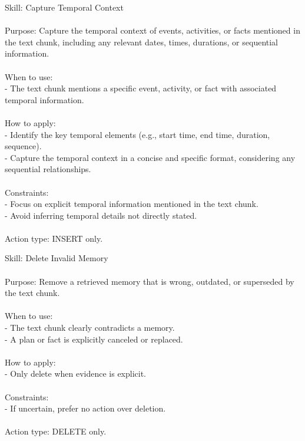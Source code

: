 \begin{center}
\begin{tcolorbox}[
  title={Evolved Skill on LoCoMo - CAPTURE\_TEMPORAL\_CONTEXT},
  colback=blue!2!white,
  colframe=blue!35!black,
  colbacktitle=blue!15!white,
  coltitle=black,
  coltext=black
]
{
Skill: Capture Temporal Context \\\\
Purpose: Capture the temporal context of events, activities, or facts mentioned in the text chunk, including any relevant dates, times, durations, or sequential information. \\\\
When to use: \\
- The text chunk mentions a specific event, activity, or fact with associated temporal information. \\\\
How to apply: \\
- Identify the key temporal elements (e.g., start time, end time, duration, sequence). \\
- Capture the temporal context in a concise and specific format, considering any sequential relationships. \\\\
Constraints: \\
- Focus on explicit temporal information mentioned in the text chunk. \\
- Avoid inferring temporal details not directly stated. \\\\
Action type: INSERT only.
}
\label{appendix:case_capture_temporal_context}
\end{tcolorbox}
\end{center}

\begin{center}
\begin{tcolorbox}[
  title={Evolved Skill on LoCoMo - DELETE},
  colback=blue!2!white,
  colframe=blue!35!black,
  colbacktitle=blue!15!white,
  coltitle=black,
  coltext=black
]
{
Skill: Delete Invalid Memory \\\\
Purpose: Remove a retrieved memory that is wrong, outdated, or superseded by the text chunk. \\\\
When to use: \\
- The text chunk clearly contradicts a memory. \\
- A plan or fact is explicitly canceled or replaced. \\\\
How to apply: \\
- Only delete when evidence is explicit. \\\\
Constraints: \\
- If uncertain, prefer no action over deletion. \\\\
Action type: DELETE only.
}
\label{appendix:case_delete}
\end{tcolorbox}
\end{center}


